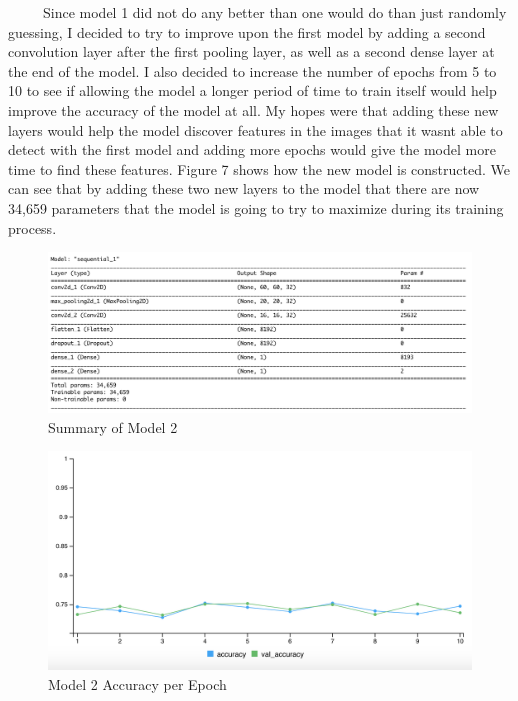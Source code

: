 \documentclass[12pt]{article}
\begin{document}
~~~~~Since model 1 did not do any better than one would do than just
randomly guessing, I decided to try to improve upon the first model by
adding a second convolution layer after the first pooling layer, as well
as a second dense layer at the end of the model. I also decided to
increase the number of epochs from 5 to 10 to see if allowing the model
a longer period of time to train itself would help improve the accuracy
of the model at all. My hopes were that adding these new layers would
help the model discover features in the images that it wasnt able to
detect with the first model and adding more epochs would give the model
more time to find these features. Figure 7 shows how the new model is
constructed. We can see that by adding these two new layers to the model
that there are now 34,659 parameters that the model is going to try to
maximize during its training process.

\begin{figure}

{\centering \includegraphics[width=0.75\linewidth,height=0.25\textheight]{images/model2} 

}

\caption{Summary of Model 2}\label{fig:sample-fig7}
\end{figure}

\begin{figure}

{\centering \includegraphics[width=0.75\linewidth,height=0.25\textheight]{images/model2out} 

}

\caption{Model 2 Accuracy per Epoch}\label{fig:sample-fig8}
\end{figure}
\end{document}
